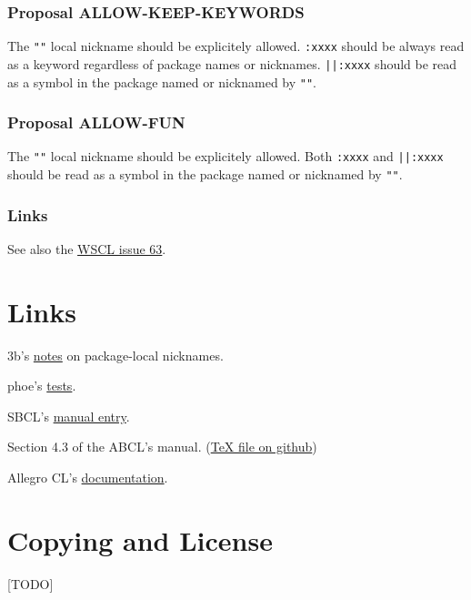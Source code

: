 \documentclass[11pt]{article}
\begin{document}
\subsubsection{Proposal ALLOW-KEEP-KEYWORDS}
\label{sec:org3d9e458}
The \texttt{""} local nickname should be explicitely allowed. \texttt{:xxxx} should be always
read as a keyword regardless of package names or nicknames. \texttt{||:xxxx} should be
read as a symbol in the package named or nicknamed by \texttt{""}.
\subsubsection{Proposal ALLOW-FUN}
\label{sec:org7afc3db}
The \texttt{""} local nickname should be explicitely allowed. Both \texttt{:xxxx} and \texttt{||:xxxx}
should be read as a symbol in the package named or nicknamed by \texttt{""}.
\subsubsection{Links}
\label{sec:orgedd3dcc}
See also the \href{https://github.com/s-expressionists/wscl/issues/63}{WSCL issue 63}.
\section{Links}
\label{sec:orgc222711}
3b's \href{https://github.com/3b/package-local-nicknames/blob/master/docs.org}{notes} on package-local nicknames.

phoe's \href{https://github.com/phoe/trivial-package-local-nicknames}{tests}.

SBCL's \href{https://www.sbcl.org/manual/\#Package\_002dLocal-Nicknames}{manual entry}.

Section 4.3 of the ABCL's manual. (\href{https://github.com/armedbear/abcl/blob/master/doc/manual/abcl.tex\#L1249}{\TeX{} file on github})

Allegro CL's \href{https://franz.com/support/documentation/11.0/packages.html\#local-nicknames-1}{documentation}.
\section{Copying and License}
\label{sec:org8a2d3cb}
[TODO]
\end{document}
